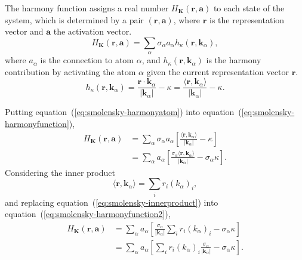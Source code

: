 The harmony function assigns a real number $H_{\mathbf{K}}(\mathbf{r}, \mathbf{a}) $ to each state of the system, which is determined by a pair $(\mathbf{r}, \mathbf{a})$, where $\mathbf{r}$ is the representation vector and $\mathbf{a}$ the activation vector.
\begin{equation}
    \label{eq:smolensky-harmonyfunction}
    H_{\mathbf{K}}(\mathbf{r}, \mathbf{a}) = \sum_{\alpha} \sigma_{\alpha} a_{\alpha} h_{\kappa}(\mathbf{r}, \mathbf{k}_{\alpha}),
\end{equation}
where $a_{\alpha}$ is the connection to atom $\alpha$, and $h_{\kappa}(\mathbf{r}, \mathbf{k}_{\alpha})$ is the harmony contribution by activating the atom $\alpha$ given the current representation vector $\mathbf{r}$.
\begin{equation}
    \label{eq:smolensky-harmonyatom}
    h_{\kappa}(\mathbf{r}, \mathbf{k}_{\alpha}) = \frac{\mathbf{r} \cdot \mathbf{k}_{\alpha}}{|\mathbf{k}_{\alpha}|} - \kappa
    = \frac{\langle \mathbf{r}, \mathbf{k}_{\alpha} \rangle}{|\mathbf{k}_{\alpha}|} - \kappa.
\end{equation}

Putting equation~(\ref{eq:smolensky-harmonyatom}) into equation~(\ref{eq:smolensky-harmonyfunction}),
\begin{equation}
  \label{eq:smolensky-harmonyfunction2}
  \begin{split}
      H_{\mathbf{K}}(\mathbf{r}, \mathbf{a}) & =  \sum_{\alpha} \sigma_{\alpha} a_{\alpha} \left[ \frac{\langle \mathbf{r}, \mathbf{k}_{\alpha} \rangle}{|\mathbf{k}_{\alpha}|} - \kappa \right] \\
      & = \sum_{\alpha} a_{\alpha} \left[ \frac{\sigma_{\alpha} \langle \mathbf{r}, \mathbf{k}_{\alpha} \rangle}{|\mathbf{k}_{\alpha}|} - \sigma_{\alpha} \kappa \right].
  \end{split}
 \end{equation}
Considering the inner product
\begin{equation}
    \label{eq:smolensky-innerproduct}
    \langle \mathbf{r}, \mathbf{k}_{\alpha} \rangle = \sum_{i} r_{i} {\left( k_{\alpha} \right)}_{i},
\end{equation}
and replacing equation~(\ref{eq:smolensky-innerproduct}) into equation~(\ref{eq:smolensky-harmonyfunction2}),
\begin{equation}
  \label{eq:smolensky-harmonyfunction3}
  \begin{split}
      H_{\mathbf{K}}(\mathbf{r}, \mathbf{a}) & = \sum_{\alpha} a_{\alpha} \left[ \frac{\sigma_{\alpha}}{|\mathbf{k}_{\alpha}|}  \sum_{i} r_{i} {\left( k_{\alpha} \right)}_{i} - \sigma_{\alpha} \kappa \right] \\
  & = \sum_{\alpha} a_{\alpha} \left[ \sum_{i} r_{i} {\left( k_{\alpha} \right)}_{i} \frac{\sigma_{\alpha}}{|\mathbf{k}_{\alpha}|} - \sigma_{\alpha} \kappa \right].
  \end{split}
\end{equation}

